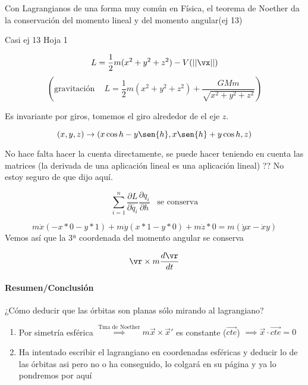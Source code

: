 \begin{obs}

	Con Lagrangianos de una forma muy común en Física, el teorema de Noether da la conservación del momento lineal y del momento angular(ej 13)

\end{obs}


\begin{example}{Casi ej 13 Hoja 1}

$$ L = \frac{1}{2} m (x^2 + y^2 + z^2) - V(||\vx ||)$$
$$(\text{gravitación } \;\;\; L = \frac{1}{2} m (x^2 + y^2 + z^2) + \frac{G M m}{\sqrt{x^2 + y^2 + z^2}})$$

Es invariante por giros, tomemos el giro alrededor de el eje $z$.

$$(x,y,z) \rightarrow (x \cos{h} - y \sen{h}, x \sen{h} + y \cos{h}, z)$$

No hace falta hacer la cuenta directamente, se puede hacer teniendo en cuenta las matrices (la derivada de una aplicación lineal es una aplicación lineal)
?? No estoy seguro de que dijo aquí.

$$\sum_{i=1}^{n} \frac{\partial L}{\partial \dot{q_i}} \frac{\partial q_i}{\partial h} \;\;\; \text{se conserva}$$

\[m \dot{x} (-x * 0 -y * 1) + m \dot{y} (x * 1 - y * 0) + m \dot{z} * 0 = m (\dot{y}x - \dot{x}y)\]
Vemos así que la 3ª coordenada del momento angular se conserva

$$\vr \times m \frac{d \vr}{d t}$$

\end{example}


\paragraph{Resumen/Conclusión}
	¿Cómo deducir que las órbitas son planas sólo mirando al lagrangiano?
	\begin{enumerate}
		\item Por simetría esférica $\stackrel{\text{Tma de Noether}}{\implies} m\overrightarrow x \times \overrightarrow x'$ es constante ($\overrightarrow{cte}$) $\implies \overrightarrow x \cdot \overrightarrow{cte} = 0$
		\item Ha intentado escribir el lagrangiano en coordenadas esféricas y deducir lo de las órbitas asi pero no o ha conseguido, lo colgará en su página y ya lo pondremos por aquí
	\end{enumerate}




